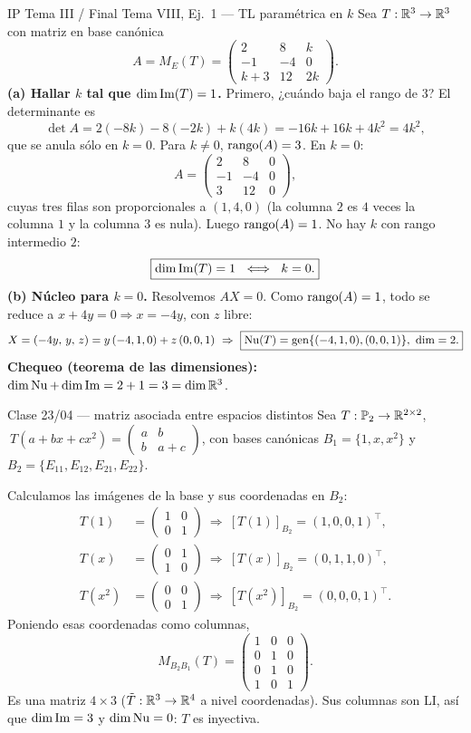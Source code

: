 \begin{ejemplo}{IP Tema III / Final Tema VIII, Ej.\ 1 --- TL paramétrica en $k$}
Sea $T:\mathbb{R}^3\to\mathbb{R}^3$ con matriz en base canónica
\[
A=M_E(T)=\begin{pmatrix}2&8&k\\ -1&-4&0\\ k+3&12&2k\end{pmatrix}.
\]
\textbf{(a) Hallar $k$ tal que $\dim\operatorname{Im}(T)=1$.} Primero, ¿cuándo baja el rango de $3$? El determinante es
\[
\det A=2(-8k)-8(-2k)+k(4k)=-16k+16k+4k^2=4k^2,
\]
que se anula sólo en $k=0$. Para $k\neq0$, $\operatorname{rango}(A)=3$. En $k=0$:
\[
A=\begin{pmatrix}2&8&0\\ -1&-4&0\\ 3&12&0\end{pmatrix},
\]
cuyas tres filas son proporcionales a $(1,4,0)$ (la columna $2$ es $4$ veces la columna $1$ y la columna $3$ es nula). Luego $\operatorname{rango}(A)=1$. No hay $k$ con rango intermedio $2$:
\[
\boxed{\dim\operatorname{Im}(T)=1\ \iff\ k=0.}
\]
\textbf{(b) Núcleo para $k=0$.} Resolvemos $AX=0$. Como $\operatorname{rango}(A)=1$, todo se reduce a $x+4y=0\Rightarrow x=-4y$, con $z$ libre:
\[
X=(-4y,\,y,\,z)=y\,(-4,1,0)+z\,(0,0,1)\ \Rightarrow\
\boxed{\Nuc(T)=\gen\{(-4,1,0),(0,0,1)\},\ \dim=2.}
\]
\textbf{Chequeo (teorema de las dimensiones):} $\dim\operatorname{Nu}+\dim\operatorname{Im}=2+1=3=\dim\mathbb{R}^3$. \checkmark
\end{ejemplo}

\begin{ejemplo}{Clase 23/04 --- matriz asociada entre espacios distintos}
Sea $T:\mathbb{P}_2\to\mathbb{R}^{2\times2}$, $\ T(a+bx+cx^2)=\begin{pmatrix}a&b\\ b&a+c\end{pmatrix}$, con bases canónicas $B_1=\{1,x,x^2\}$ y $B_2=\{E_{11},E_{12},E_{21},E_{22}\}$.

Calculamos las imágenes de la base y sus coordenadas en $B_2$:
\begin{align*}
T(1)&=\begin{pmatrix}1&0\\0&1\end{pmatrix}\ \Rightarrow\ [T(1)]_{B_2}=(1,0,0,1)^\top,\\
T(x)&=\begin{pmatrix}0&1\\1&0\end{pmatrix}\ \Rightarrow\ [T(x)]_{B_2}=(0,1,1,0)^\top,\\
T(x^2)&=\begin{pmatrix}0&0\\0&1\end{pmatrix}\ \Rightarrow\ [T(x^2)]_{B_2}=(0,0,0,1)^\top.
\end{align*}
Poniendo esas coordenadas como columnas,
\[
M_{B_2B_1}(T)=\begin{pmatrix}1&0&0\\ 0&1&0\\ 0&1&0\\ 1&0&1\end{pmatrix}.
\]
Es una matriz $4\times3$ ($\tilde T:\mathbb{R}^3\to\mathbb{R}^4$ a nivel coordenadas). Sus columnas son LI, así que $\dim\operatorname{Im}=3$ y $\dim\operatorname{Nu}=0$: $T$ es inyectiva.
\end{ejemplo}

